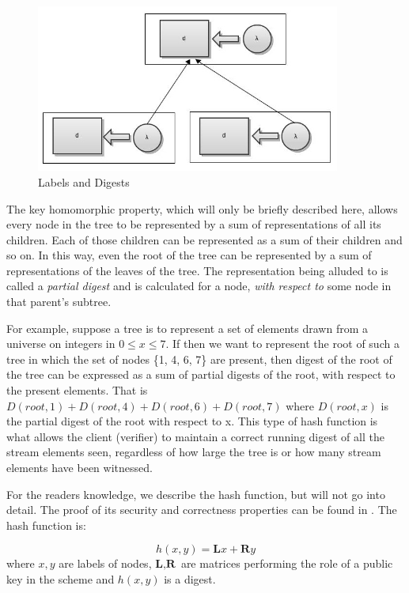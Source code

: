 \documentclass[11pt, letterpaper, oneside]{article}
\begin{document}
        \begin{figure}[h]
        \centering
        \includegraphics[width=100mm]{./images/label_digest.jpg}
        \caption[]{Labels and Digests}
        \label{fig:labels-and-digests}
        \end{figure}

	The key homomorphic property, which will only be briefly described here, allows every node in the tree to be represented by a sum of representations of all its children.
	Each of those children can be represented as a sum of their children and so on.
	In this way, even the root of the tree can be represented by a sum of representations of the leaves of the tree.
	The representation being alluded to is called a \textit{partial digest} and is calculated for a node, \textit{with respect to} some node in that parent's subtree.
	
	For example, suppose a tree is to represent a set of elements drawn from a universe on integers in $0 \leq x \leq 7$.
	If then we want to represent the root of such a tree in which the set of nodes \{1, 4, 6, 7\} are present, then digest of the root of the tree can be expressed as a sum of partial digests of the root, with respect to the present elements.
	That is $\textit{D}(root, 1)+\textit{D}(root, 4)+\textit{D}(root, 6)+\textit{D}(root, 7)$ where $\textit{D}(root, x)$ is the partial digest of the root with respect to x.
	This type of hash function is what allows the client (verifier) to maintain a correct running digest of all the stream elements seen, regardless of how large the tree is or how many stream elements have been witnessed.
       	
	For the readers knowledge, we describe the hash function, but will not go into detail.  The proof of its security and correctness properties can be found in \cite{sads}.
	The hash function is:
	
	\begin{equation}
		h(x,y)= \textbf{L} x + \textbf{R}y
	\end{equation}
	where $x, y$ are labels of nodes, $\textbf{L}, \textbf{R}$ are matrices performing the role of a public key in the scheme and $h(x,y)$ is a digest.
		
\end{document}
